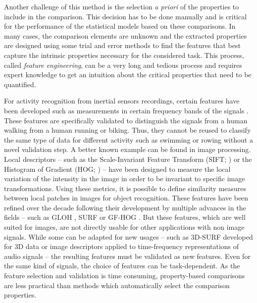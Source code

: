 \documentclass[../thesis.tex]{subfiles}
\begin{document}
{Another challenge of this method is the selection \emph{a priori} of the properties to include in the comparison. This decision has to be done manually and is critical for the performance of the statistical models based on these comparisons. In many cases, the comparison elements are unknown and the extracted properties are designed using some trial and error methods to find the features that best capture the intrinsic properties necessary for the considered task. This process, called \emph{feature engineering}, can be a very long and tedious process and requires expert knowledge to get an intuition about the critical properties that need to be quantified.



For activity recognition from inertial sensors recordings, certain features have been developed such as measurements in certain frequency bands of the signals \citep{Oudre2012}. These features are specifically validated to distinguish the signals from a human walking from a human running or biking. Thus, they cannot be reused to classify the same type of data for different activity such as swimming or rowing without a novel validation step. A better known example can be found in image processing. Local descriptors -- such as the Scale-Invariant Feature Transform (SIFT; \citealt{Lowe1999}) or the Histogram of Gradient (HOG; \citealt{Dalal2005}) -- have been designed to measure the local variation of the intensity in the image in order to be invariant to specific image transformations. Using these metrics, it is possible to define similarity measures between local patches in images for object recognition. These features have been refined over the decade following their development by multiple advances in the fields -- such as GLOH \citep{Mikolajczyk2005}, SURF \citep{Bay2008} or GF-HOG \citep{Hu2010}. But these features, which are well suited for images, are not directly usable for other applications with non image signals. While some can be adapted for new usages -- such as 3D-SURF developed for 3D data \citep{Knopp2010} or image descriptors applied to time-frequency representations of audio signals \citep{Zhu2010, Rakotomamonjy2015} -- the resulting features must be validated as new features. Even for the same kind of signals, the choice of features can be task-dependent. As the feature selection and validation is time consuming, property-based comparisons are less practical than methods which automatically select the comparison properties.



}
\end{document}
